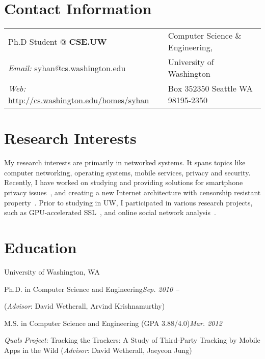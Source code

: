 \documentclass[margin,line]{res}
\newenvironment{list1}{
  \begin{list}{\ding{113}}{%
      \setlength{\itemsep}{0in}
      \setlength{\parsep}{0in} \setlength{\parskip}{0in}
      \setlength{\topsep}{0in} \setlength{\partopsep}{0in}
      \setlength{\leftmargin}{0.17in}}}{\end{list}}
\begin{document}

\begin{resume}

\section{\sc Contact Information}
\vspace{.05in}

\begin{tabular}{@{}p{3in}p{3in}}
Ph.D Student @ \textbf{CSE.UW}                & Computer Science \& Engineering,\\
{\it Email:} syhan@cs.washington.edu		  &University of Washington    \\
{\it Web:} \url{http://cs.washington.edu/homes/syhan}	  & Box 352350 Seattle WA 98195-2350   \\
\end{tabular}

\section{\sc Research Interests}
My research interests are primarily in networked systems. 
It spans topics like computer networking, operating systems, mobile services, privacy and security. 
Recently, I have worked on studying and providing solutions for smartphone privacy issues~\cite{spsm12,nsdi12,ccs2011}, 
and creating a new Internet architecture with censorship resistant property~\cite{hotnets11}.
Prior to studying in UW, I participated in various research projects, such as GPU-accelerated SSL~\cite{nsdi11}, 
and online social network analysis~\cite{www07}.


\section{\sc Education}
University of Washington, WA \\
\vspace*{-.1in}
\begin{list1}
\item[] Ph.D. in Computer Science and Engineering\hfill{\it Sep. 2010 -- }
\item[] (\textit{Advisor}: David Wetherall, Arvind Krishnamurthy)
\item[] M.S. in Computer Science and Engineering (GPA 3.88/4.0)\hfill{\it Mar. 2012}
\item[] \textit{Quals Project}: Tracking the Trackers: A Study of Third-Party Tracking by Mobile Apps in the Wild (\textit{Advisor}: David Wetherall, Jaeyeon Jung) 
\end{list1}



\end{resume}
\end{document}
